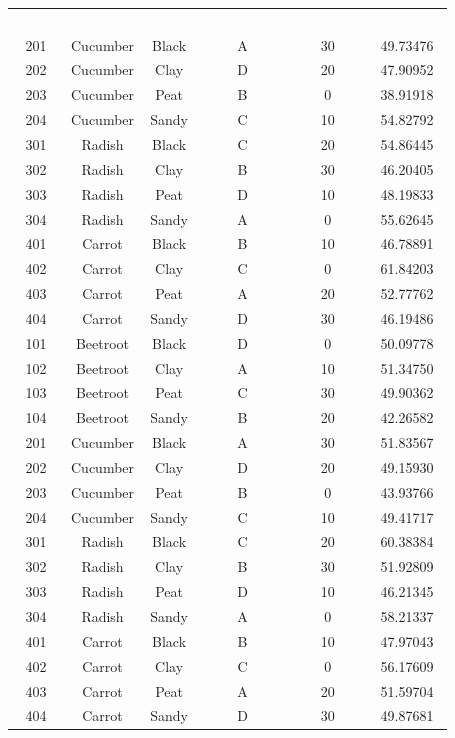 \documentclass{article}
\begin{document}
\begin{table}[h]
\centering
\small
\begin{tabular}{|c|c|c|c|c|c|}
~ ~ ~ ~ & ~ ~ ~ ~ ~ & ~ ~ ~ ~ & ~ ~ ~ ~ ~ ~ ~ & ~ ~ ~ ~ ~ ~ & ~ ~ ~ ~ ~ ~ \\
201 & Cucumber & Black & A & 30 & 49.73476 \\
202 & Cucumber & Clay & D & 20 & 47.90952 \\
203 & Cucumber & Peat & B & 0 & 38.91918 \\
204 & Cucumber & Sandy & C & 10 & 54.82792 \\
301 & Radish & Black & C & 20 & 54.86445 \\
302 & Radish & Clay & B & 30 & 46.20405 \\
303 & Radish & Peat & D & 10 & 48.19833 \\
304 & Radish & Sandy & A & 0 & 55.62645 \\
401 & Carrot & Black & B & 10 & 46.78891 \\
402 & Carrot & Clay & C & 0 & 61.84203 \\
403 & Carrot & Peat & A & 20 & 52.77762 \\
404 & Carrot & Sandy & D & 30 & 46.19486 \\
101 & Beetroot & Black & D & 0 & 50.09778 \\
102 & Beetroot & Clay & A & 10 & 51.34750 \\
103 & Beetroot & Peat & C & 30 & 49.90362 \\
104 & Beetroot & Sandy & B & 20 & 42.26582 \\
201 & Cucumber & Black & A & 30 & 51.83567 \\
202 & Cucumber & Clay & D & 20 & 49.15930 \\
203 & Cucumber & Peat & B & 0 & 43.93766 \\
204 & Cucumber & Sandy & C & 10 & 49.41717 \\
301 & Radish & Black & C & 20 & 60.38384 \\
302 & Radish & Clay & B & 30 & 51.92809 \\
303 & Radish & Peat & D & 10 & 46.21345 \\
304 & Radish & Sandy & A & 0 & 58.21337 \\
401 & Carrot & Black & B & 10 & 47.97043 \\
402 & Carrot & Clay & C & 0 & 56.17609 \\
403 & Carrot & Peat & A & 20 & 51.59704 \\
404 & Carrot & Sandy & D & 30 & 49.87681 \\

\end{tabular}
\end{table}
\end{document}
